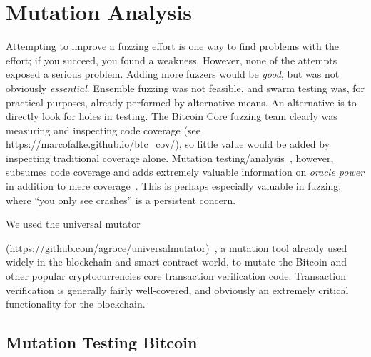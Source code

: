 \section{Mutation Analysis}

Attempting to improve a fuzzing effort is one way to find problems
with the effort; if you succeed, you found a weakness.  However, none
of the attempts exposed a serious problem.  Adding more fuzzers would
be \emph{good}, but was not obviously \emph{essential}.  Ensemble
fuzzing was not feasible, and swarm testing was, for practical
purposes, already performed by alternative means.  An alternative is
to directly look for holes in testing.  The Bitcoin Core fuzzing team
clearly was measuring and inspecting code coverage (see \url{https://marcofalke.github.io/btc_cov/}), so little value
would be added by inspecting traditional coverage alone.  Mutation
testing/analysis~\cite{MutationSurvey}, however, subsumes code coverage and adds extremely
valuable information on \emph{oracle power} in addition to mere
coverage~\cite{Discontents}.  This is perhaps especially valuable in fuzzing, where ``you
only see crashes'' is a persistent concern.

We used the universal mutator

\noindent(\url{https://github.com/agroce/universalmutator})~\cite{regexpMut},
a mutation tool already used widely in the blockchain and smart contract
world, to mutate the Bitcoin and other popular cryptocurrencies core transaction verification code.
Transaction verification is generally fairly well-covered, and obviously an extremely critical functionality for the
blockchain.

\subsection{Mutation Testing Bitcoin}

